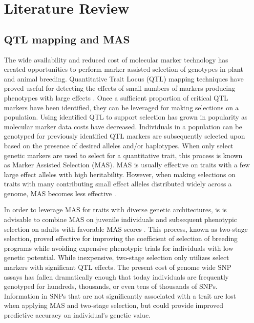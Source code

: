 \section{Literature Review} \label{sec:lit-review}

\subsection{QTL mapping and MAS}

The wide availability and reduced cost of molecular marker technology
has created opportunities to perform marker assisted selection of genotypes
in plant and animal breeding. Quantitative Trait Locus (QTL) mapping techniques
have proved useful for detecting the effects of small numbers of markers producing 
phenotypes with large effects \citep{miles2008}. Once a sufficient proportion of
critical QTL markers have been identified, they can be leveraged for making selections
on a population. Using identified QTL to support selection has grown in popularity
as molecular marker data costs have decreased. Individuals in a population
can be genotyped for previously identified QTL markers are subsequently selected 
upon based on the presence of desired alleles and/or haplotypes.
When only select genetic markers are used to select for a quantitative trait,
this process is known as Marker Assisted Selection (MAS). MAS is usually effective on
traits with a few large effect alleles with high heritability. However, when making selections 
on traits with many contributing small effect alleles distributed widely 
across a genome, MAS becomes less effective \citep{heffner2009}. 

In order to leverage MAS for traits with diverse genetic architectures, is is
advisable to combine MAS on juvenile individuals and subsequent phenotypic
selection on adults with favorable MAS scores \citep{lande1990}. This process, 
known as two-stage selection, proved effective for improving
the coefficient of selection of breeding programs while avoiding expensive phenotypic
trials for individuals with low genetic potential. While inexpensive, two-stage selection 
only utilizes select markers with significant QTL effects. The present cost of
genome wide SNP assays has fallen dramatically enough that today individuals are
frequently genotyped for hundreds, thousands, or even tens of thousands of SNPs. 
Information in SNPs that are not significantly associated with a trait are lost 
when applying MAS and two-stage selection, but could provide improved predictive 
accuracy on individual's genetic value.

